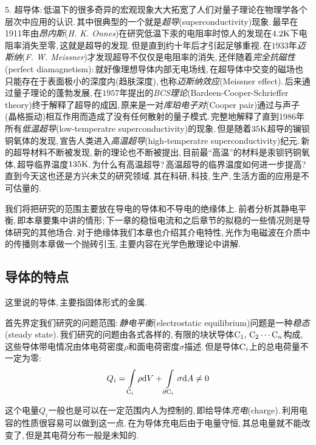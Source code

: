 	\vspace{0.3cm} 5. 超导体:\,低温下的很多奇异的宏观现象大大拓宽了人们对量子理论在物理学各个层次中应用的认识.\,其中很典型的一个就是\emph{超导}(superconductivity)现象.\,最早在1911年由\emph{昂内斯}({\it H. K. Onnes})在研究低温下汞的电阻率时惊人的发现在$4.2{\rm K}$下电阻率消失至零,\,这就是超导的发现.\,但是直到约十年后才引起足够重视.\,在$1933$年\emph{迈斯纳}({\it F. W. Meissner})才发现超导不仅仅是电阻率的消失,\,还伴随着\emph{完全抗磁性}(perfect diamagnetism):\,就好像理想导体内部无电场线,\,在超导体中交变的磁场也只能存在于表面极小的深度内(趋肤深度),\,也称\emph{迈斯纳效应}(Meissner effect).\,后来通过量子理论的蓬勃发展,\,在$1957$年提出的\emph{BCS理论}(Bardeen-Cooper-Schrieffer theory)终于解释了超导的成因,\,原来是一对\emph{库珀电子对}(Cooper pair)通过与声子(晶格振动)相互作用而造成了没有任何散射的量子模式.\,完整地解释了直到1986年所有\emph{低温超导}(low-temperatre superconductivity)的现象.\,但是随着$35{\rm K}$超导的镧钡铜氧体的发现,\,宣告人类进入\emph{高温超导}(high-temperatre superconductivity)纪元.\,新的超导材料不断被发现,\,新的理论也不断被提出,\,目前最``高温''的材料是汞钡钙铜氧体,\,超导临界温度$135{\rm K}$.\,为什么有高温超导?\,高温超导的临界温度如何进一步提高?\,直到今天这也还是方兴未艾的研究领域.\,其在科研,\,科技,\,生产,\,生活方面的应用是不可估量的.

\vspace{0.5cm}

我们将把研究的范围主要放在导电的导体和不导电的绝缘体上.\,前者分析其静电平衡,\,即本章要集中讲的情形;\,下一章的稳恒电流和之后章节的拟稳的一些情况则是导体研究的其他场合.\,对于绝缘体我们本章也介绍其介电特性,\,光作为电磁波在介质中的传播则本章做一个抛砖引玉,\,主要内容在光学色散理论中讲解.

\subsection{导体的特点}

这里说的导体,\,主要指固体形式的金属.

首先界定我们研究的问题范围:\,\emph{静电平衡}(electrostatic equilibrium)问题是一种\emph{稳态}(steady state).\,我们研究的问题由各式各样的,\,有限的块状导体${\rm C}_1,\,{\rm C}_2\cdots {\rm C}_n$构成,\,这些导体带电情况由体电荷密度$\rho$和面电荷密度$\sigma$描述.\,但是导体${\rm C}_i$上的总电荷量不一定为零:
\[Q_i=\int\limits_{{\rm C}_i}\rho \textrm{d} V+\int\limits_{\partial{\rm C}_i}\sigma \textrm{d} A\neq 0\]

这个电量$Q_i$一般也是可以在一定范围内人为控制的,\,即给导体\emph{充电}(charge).\,利用电容的性质很容易可以做到这一点.\,在为导体充电后由于电量守恒,\,其总电量就不能改变了,\,但是其电荷分布一般是未知的.


